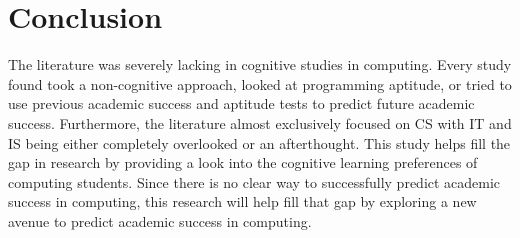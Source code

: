 \section{Conclusion}
The literature was severely lacking in cognitive studies in computing. Every study found took a non-cognitive approach, looked at programming aptitude, or tried to use previous academic success and aptitude tests to predict future academic success. Furthermore, the literature almost exclusively focused on CS with IT and IS being either completely overlooked or an afterthought. This study helps fill the gap in research by providing a look into the cognitive learning preferences of computing students. Since there is no clear way to successfully predict academic success in computing, this research will help fill that gap by exploring a new avenue to predict academic success in computing.
